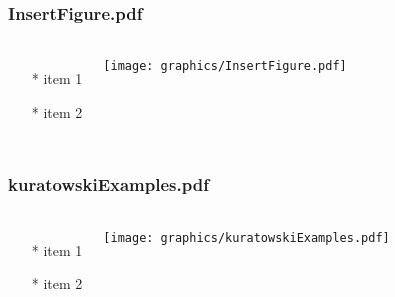 \begin{frame} \frametitle{InsertFigure.pdf}
    \begin{columns}[c]
        \begin{itemize}
            \item[*] item 1
            \item[*] item 2
        \end{itemize}
        \begin{minipage}{\linewidth}
            \begin{center}
            \texttt{[image: graphics/InsertFigure.pdf]}
            \label{gfx:InsertFigure.pdf}
            \end{center}
        \end{minipage}
    \end{columns}
\end{frame}
\begin{frame} \frametitle{kuratowskiExamples.pdf}
    \begin{columns}[c]
        \begin{itemize}
            \item[*] item 1
            \item[*] item 2
        \end{itemize}
        \begin{minipage}{\linewidth}
            \begin{center}
            \texttt{[image: graphics/kuratowskiExamples.pdf]}
            \label{gfx:kuratowskiExamples.pdf}
            \end{center}
        \end{minipage}
    \end{columns}
\end{frame}
